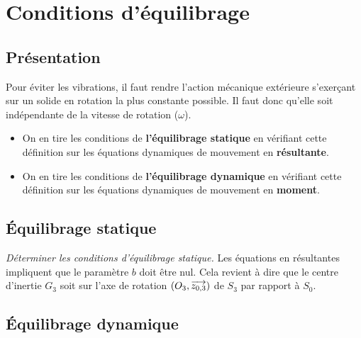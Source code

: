 \documentclass[10pt,fleqn]{article} %
\begin{document}
\section{Conditions d'équilibrage}

\subsection{Présentation}

\begin{definition}
Pour éviter les vibrations, il faut rendre l'action mécanique extérieure s'exerçant sur un solide en rotation la plus constante possible. Il faut donc qu'elle soit indépendante de la vitesse de rotation ($\omega$).
\begin{itemize}
\item On en tire les conditions de \textbf{l'équilibrage statique} en vérifiant cette définition sur les équations dynamiques de mouvement en \textbf{résultante}.
\item On en tire les conditions de \textbf{l'équilibrage dynamique} en vérifiant cette définition sur les équations dynamiques de mouvement en \textbf{moment}.
\end{itemize}
 
\end{definition}

\subsection{Équilibrage statique}

\begin{exemple}

\textit{Déterminer les conditions d'équilibrage statique.}
\ifprof
Les équations en résultantes impliquent que le paramètre $b$ doit être nul. Cela revient à dire que le centre d'inertie $G_3$ soit sur l'axe de rotation $\left(O_3,\overrightarrow{z_{0,3}}\right)$ de $S_3$ par rapport à $S_0$.
\else
\vspace{4cm}
\fi
\end{exemple}

\newpage
\subsection{Équilibrage dynamique}
\end{document}
